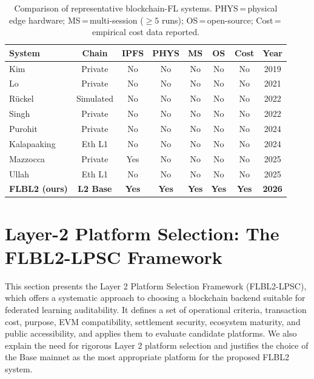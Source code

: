 \documentclass{llncs}
\begin{document}
\begin{table}[t]
\caption{Comparison of representative blockchain-FL systems.
  PHYS\,=\,physical edge hardware; MS\,=\,multi-session (${\geq}5$ runs);
  OS\,=\,open-source; Cost\,=\,empirical cost data reported.}
\label{tab:related}
\centering
\footnotesize
\setlength{\tabcolsep}{3pt}
\begin{tabular}{lccccccc}
\toprule
\textbf{System} & \textbf{Chain} & \textbf{IPFS} & \textbf{PHYS} &
  \textbf{MS} & \textbf{OS} & \textbf{Cost} & \textbf{Year} \\
\midrule
Kim~\cite{kim2019blockchained}              & Private   & No  & No  & No  & No  & No  & 2019 \\
Lo~\cite{lo2021trustworthy}                 & Private   & No  & No  & No  & No  & No  & 2021 \\
Rückel~\cite{ruckel2022fairness}            & Simulated & No  & No  & No  & No  & No  & 2022 \\
Singh~\cite{singh2022framework}             & Private   & No  & No  & No  & No  & No  & 2022 \\
Purohit~\cite{purohit2024fedblocks}         & Private   & No  & No  & No  & No  & No  & 2024 \\
Kalapaaking~\cite{kalapaaking2024auditable} & Eth L1    & No  & No  & No  & No  & No  & 2024 \\
Mazzocca~\cite{mazzocca2025fedcoordination} & Private   & Yes & No  & No  & No  & No  & 2025 \\
Ullah~\cite{ullah2025spbfl}                 & Eth L1    & No  & No  & No  & No  & No  & 2025 \\
\textbf{FLBL2 (ours)} & \textbf{L2 Base} & \textbf{Yes} & \textbf{Yes} &
  \textbf{Yes} & \textbf{Yes} & \textbf{Yes} & \textbf{2026} \\
\bottomrule
\end{tabular}
\end{table}


\FloatBarrier
\section{Layer-2 Platform Selection: The FLBL2-LPSC Framework}
\label{sec:l2selection}
This section presents the Layer 2 Platform Selection Framework (FLBL2-LPSC), which offers a systematic approach to choosing a blockchain backend suitable for federated learning auditability. It defines a set of operational criteria, transaction cost, purpose, EVM compatibility, settlement security, ecosystem maturity, and public accessibility, and applies them to evaluate candidate platforms. We also explain the need for rigorous Layer 2 platform selection and justifies the choice of the Base mainnet as the most appropriate platform for the proposed FLBL2 system.
\end{document}
